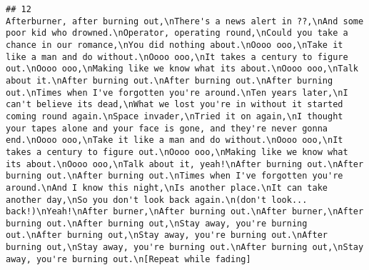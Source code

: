 \documentclass[]{article}
\begin{document}
\begin{verbatim}
## 12                                                                                                                                                                                                                                                                                                                                                                                                                                                                                                                                                                                                                                                                                                                                                                                                                                                                                                                                                                                                                                                                                                                                                                                                                                                                                                                                                                                                                                                                                                                                                                                                                                                                                                Afterburner, after burning out,\nThere's a news alert in ??,\nAnd some poor kid who drowned.\nOperator, operating round,\nCould you take a chance in our romance,\nYou did nothing about.\nOooo ooo,\nTake it like a man and do without.\nOooo ooo,\nIt takes a century to figure out.\nOooo ooo,\nMaking like we know what its about.\nOooo ooo,\nTalk about it.\nAfter burning out.\nAfter burning out.\nAfter burning out.\nTimes when I've forgotten you're around.\nTen years later,\nI can't believe its dead,\nWhat we lost you're in without it started coming round again.\nSpace invader,\nTried it on again,\nI thought your tapes alone and your face is gone, and they're never gonna end.\nOooo ooo,\nTake it like a man and do without.\nOooo ooo,\nIt takes a century to figure out.\nOooo ooo,\nMaking like we know what its about.\nOooo ooo,\nTalk about it, yeah!\nAfter burning out.\nAfter burning out.\nAfter burning out.\nTimes when I've forgotten you're around.\nAnd I know this night,\nIs another place.\nIt can take another day,\nSo you don't look back again.\n(don't look... back!)\nYeah!\nAfter burner,\nAfter burning out.\nAfter burner,\nAfter burning out.\nAfter burning out,\nStay away, you're burning out.\nAfter burning out,\nStay away, you're burning out.\nAfter burning out,\nStay away, you're burning out.\nAfter burning out,\nStay away, you're burning out.\n[Repeat while fading]

\end{verbatim}
\end{document}
